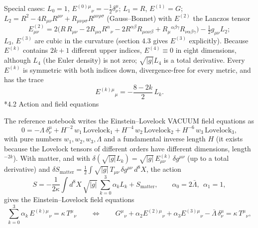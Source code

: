 \documentclass[10pt,a4paper]{article}
\makeatletter
\renewcommand\subsection{\@startsection{subsection}{2}{\z@}{-3.25ex\@plus -1ex \@minus -.2ex}{1.5ex \@plus .2ex}{\normalfont\large\bfseries\raggedright}}
\makeatother
\begin{document}
Special cases: $L_0=1$, $E^{(0)\mu}{}_\nu=-\tfrac12\delta^\mu_\nu$; $L_1=R$, $E^{(1)}=G$; $L_2=R^2-4R_{\mu\nu}R^{\mu\nu}+R_{\mu\nu\rho\sigma}R^{\mu\nu\rho\sigma}$ (Gauss–Bonnet) with $E^{(2)}$ the Lanczos tensor
\begin{equation*}
E^{(2)}_{\mu\nu}=2\big(R\,R_{\mu\nu}-2R_{\mu\alpha}R^{\alpha}{}_{\nu}-2R^{\alpha\beta}R_{\mu\alpha\nu\beta}+R_{\mu}{}^{\alpha\beta\gamma}R_{\nu\alpha\beta\gamma}\big)-\tfrac12 g_{\mu\nu}L_2 ;
\end{equation*}
$L_3$, $E^{(3)}$ are cubic in the curvature (section 4.3 gives $E^{(3)}$ explicitly). Because $E^{(k)}$ contains $2k+1$ different upper indices, $E^{(4)}\equiv0$ in eight dimensions, although $L_4$ (the Euler density) is not zero; $\sqrt{|g|}L_4$ is a total derivative. Every $E^{(k)}$ is symmetric with both indices down, divergence-free for every metric, and has the trace
\begin{equation*}
E^{(k)\mu}{}_{\mu}=-\frac{8-2k}{2}\,L_k .
\end{equation*}
\subsection*{4.2 Action and field equations}
The reference notebook writes the Einstein–Lovelock VACUUM field equations as
\begin{equation*}
0=-\Lambda\,\delta^\mu_\nu+H^{-2}\,w_1\,\mathrm{Lovelock}_1+H^{-4}\,w_2\,\mathrm{Lovelock}_2+H^{-6}\,w_3\,\mathrm{Lovelock}_3,
\end{equation*}
with pure numbers $w_1,w_2,w_3,\Lambda$ and a fundamental inverse length $H$ (it exists because the Lovelock tensors of different orders have different dimensions, length$^{-2k}$). With matter, and with $\delta(\sqrt{|g|}L_k)=\sqrt{|g|}\,E^{(k)}_{\mu\nu}\,\delta g^{\mu\nu}$ (up to a total derivative) and $\delta S_{\text{matter}}=\tfrac12\int\sqrt{|g|}\,T_{\mu\nu}\,\delta g^{\mu\nu}\,d^8X$, the action
\begin{equation*}
S=-\frac{1}{2\kappa}\int d^8X\,\sqrt{|g|}\,\sum_{k=0}^{3}\alpha_k L_k+S_{\text{matter}},\qquad \alpha_0=2\bar\Lambda,\ \ \alpha_1=1,
\end{equation*}
gives the Einstein–Lovelock field equations
\begin{equation*}
\sum_{k=0}^{3}\alpha_k\,E^{(k)\mu}{}_{\nu}=\kappa\,T^\mu{}_\nu\qquad\Longleftrightarrow\qquad G^\mu{}_\nu+\alpha_2E^{(2)\mu}{}_\nu+\alpha_3E^{(3)\mu}{}_\nu-\bar\Lambda\,\delta^\mu_\nu=\kappa\,T^\mu{}_\nu,
\end{equation*}
\end{document}
